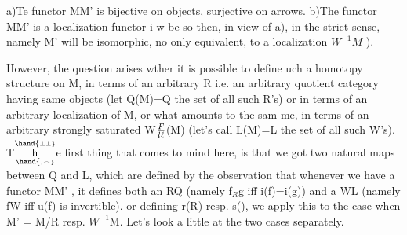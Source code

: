 a)\quad Te functor M\hand{$\to$}M' is bijective on objects,  surjective on arrows.
b)\quad The functor M\hand{$\to$}M' is a localization functor \hand{(}i w be so then,  in
view of a),  in the strict sense,  namely M' will be isomorphic,  no
only equivalent, to a localization $W^{-1}M$ ).

However,  the question arises wther it is possible to define uch
a homotopy structure on M,  in terms of an arbitrary R i.e. an arbitrary
quotient category having same objects  (let Q(M)=Q the set of all such R's)\hand{,}
or in terms of an arbitrary localization of M,  or what amounts to the sam
me,  in terms of an arbitrary strongly saturated W\hand{$\subset$}$F\over{l}{\ell}$(M)  (let's call
L(M)=L  the set of all such W's).  T$\overset{\hand{\scriptscriptstyle\perp\perp}}{\underset{\hand{\scriptscriptstyle,\frown}}{\mathrm h}}$e first thing that comes to mind
here,  is that we got two natural maps
 
between Q and L,  which are defined by the observation that whenever we
have a functor  M\hand{$\to$}M' ,  it defines both an R\hand{$\in$}Q  (namely f\hand{$\sim$}$_{R}$g  iff
i(f)=i(g))  and a W\hand{$\in$}L (namely f\hand{$\in$}W  iff u(f) is invertible).  or defining
r(R)  resp. s(),  we apply this to the case when M' = M/R  resp. $W^{-1}$M.
Let's look a little at the two cases separately.

